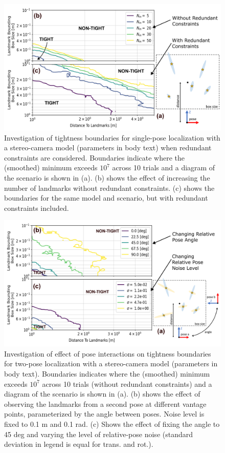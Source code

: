 \documentclass[lettersize,journal]{IEEEtran}
\newcommand{\rev}[1]{\color{red}{#1}\color{black}}
\begin{document}
\begin{figure}[!t]
	\centering
	\includegraphics[width=\columnwidth]{figs/stereo_redun_study}
	\caption{Investigation of tightness boundaries for single-pose localization with a stereo-camera model (parameters in body text) when redundant constraints are considered. Boundaries indicate where the (smoothed) minimum \rev{ER } exceeds $ 10^{7}$ across 10 trials and a diagram of the scenario is shown in (a). (b) shows the effect of increasing the number of landmarks without redundant constraints. (c) shows the boundaries for the same model and scenario, but with redundant constraints included.}
	\label{fig:stereo_redun}
\end{figure}

\begin{figure}[!b]
	\centering
	\includegraphics[width=\columnwidth]{figs/stereo_angle_study}
	\caption{Investigation of effect of pose interactions on tightness boundaries for two-pose localization with a stereo-camera model (parameters in body text). Boundaries indicates where the (smoothed) minimum \rev{ER } exceeds $ 10^{7}$ across 10 trials (without redundant constraints) and a diagram of the scenario is shown in (a). (b) shows the effect of observing the landmarks from a second pose at different vantage points, parameterized by the angle between poses. Noise level is fixed to 0.1 m and 0.1 rad. (c) Shows the effect of fixing the angle to 45 deg and varying the level of relative-pose noise (standard deviation in legend is equal for trans. and rot.).}
	\label{fig:stereo_angle}
\end{figure}
\end{document}
